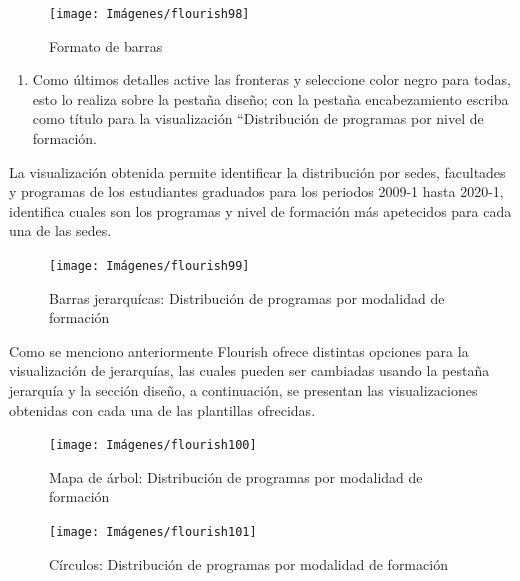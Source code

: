 \documentclass[
]{book}
\providecommand{\tightlist}{%
  \setlength{\itemsep}{0pt}\setlength{\parskip}{0pt}}
\begin{document}
\begin{figure}

{\centering \texttt{[image: Imágenes/flourish98]} 

}

\caption{Formato de barras}\label{fig:paso8jerarquiaflourish-fig}
\end{figure}

\begin{enumerate}
\def\labelenumi{\arabic{enumi}.}
\setcounter{enumi}{8}
\tightlist
\item
  Como últimos detalles active las fronteras y seleccione color negro para todas, esto lo realiza sobre la pestaña diseño; con la pestaña encabezamiento escriba como título para la visualización ``Distribución de programas por nivel de formación.
\end{enumerate}

La visualización obtenida permite identificar la distribución por sedes, facultades y programas de los estudiantes graduados para los periodos 2009-1 hasta 2020-1, identifica cuales son los programas y nivel de formación más apetecidos para cada una de las sedes.

\begin{figure}

{\centering \texttt{[image: Imágenes/flourish99]} 

}

\caption{Barras jerarquícas: Distribución de programas por modalidad de formación}\label{fig:barrasjerarquiaflourish-fig}
\end{figure}

Como se menciono anteriormente Flourish ofrece distintas opciones para la visualización de jerarquías, las cuales pueden ser cambiadas usando la pestaña jerarquía y la sección diseño, a continuación, se presentan las visualizaciones obtenidas con cada una de las plantillas ofrecidas.

\begin{figure}

{\centering \texttt{[image: Imágenes/flourish100]} 

}

\caption{Mapa de árbol: Distribución de programas por modalidad de formación}\label{fig:mapadearboljerarquiaflourish-fig}
\end{figure}

\begin{figure}

{\centering \texttt{[image: Imágenes/flourish101]} 

}

\caption{Círculos: Distribución de programas por modalidad de formación}\label{fig:circulosjerarquiaflourish-fig}
\end{figure}
\end{document}
